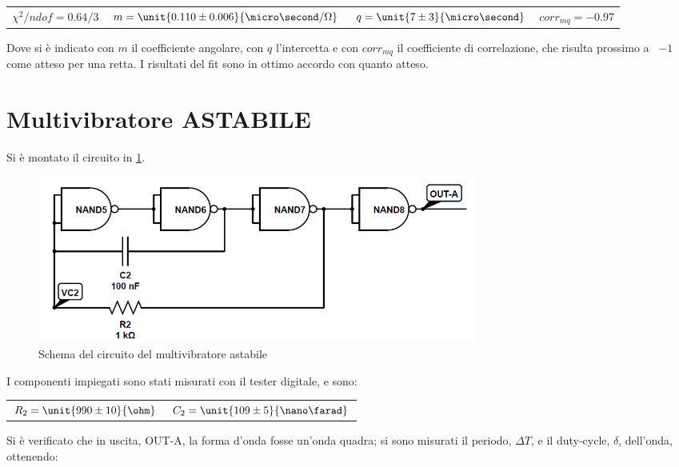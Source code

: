 \documentclass[a4paper,10pt]{article}
\begin{document}
\begin{table}[H]
	\centering
	\begin{tabular}{cccc}
		$\chi^2/ndof = 0.64/3$ & $m = \unit{ 0.110\pm0.006 }{\micro\second / \Omega}$ & $q = \unit{ 7\pm3 }{\micro\second}$ & $corr_{mq} = -0.97 $\\
	\end{tabular}
\end{table}

Dove si è indicato con $m$ il coefficiente angolare, con $q$ l'intercetta e con $corr_{mq}$ il coefficiente di correlazione, che risulta prossimo a ~$-1$ come atteso per una retta. I risultati del fit sono in ottimo accordo con quanto atteso.



\section{Multivibratore ASTABILE}

Si è montato il circuito in \cref{fig:AST}.

\begin{figure}[H]
	\centering
	\includegraphics[width=0.7\textwidth]{../grafici/Astabile.png}
	\caption{Schema del circuito del multivibratore astabile}
	\label{fig:AST}
\end{figure}

I componenti impiegati sono stati misurati con il tester digitale, e sono:

\begin{table}[H]
	\centering
	\begin{tabular}{cc}
		$R_2 = \unit{990 \pm 10}{\ohm}$ & $C_2 = \unit{109 \pm 5}{\nano\farad}$\\
	\end{tabular}
\end{table}

Si è verificato che in uscita, OUT-A, la forma d'onda fosse un'onda quadra; si sono misurati il periodo, $\Delta T$, e il duty-cycle, $\delta$, dell'onda, ottenendo:
\end{document}
